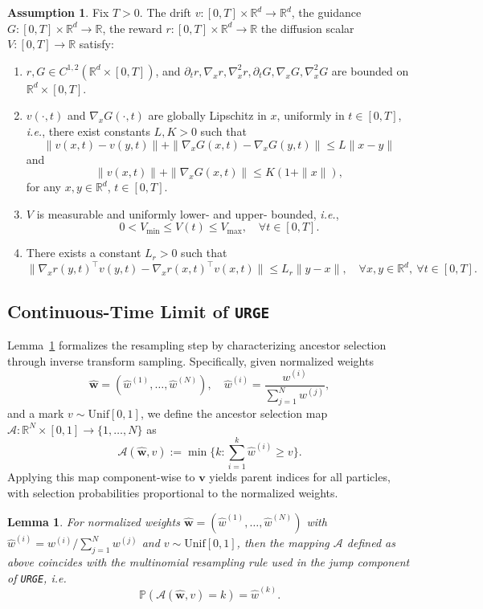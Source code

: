 \documentclass{article}
\newcommand{\mathbbm}[1]{\boldsymbol{#1}}
\theoremstyle{plain}
\newtheorem{lemma}[theorem]{Lemma}
\theoremstyle{definition}
\newtheorem{assumption}[theorem]{Assumption}
\theoremstyle{remark}
\renewcommand{\P}{{\mathbb{P}}}
\newcommand{\R}{{\mathbb{R}}}
\begin{document}
\begin{assumption}\label{basic_assumption_on_diffusion}
Fix $T>0$. The drift $v:[0,T]\times\mathbb R^d\to\mathbb R^d$, the guidance \(G:[0,T]\times\mathbb R^d\rightarrow\R\), the reward \(r:[0,T]\times\mathbb R^d\rightarrow\R\) the diffusion scalar $V:[0,T]\to\mathbb R$ satisfy:
\begin{enumerate}
    \item $r,G \in C^{1,2}(\mathbb R^d\times[0,T])$, and $\partial_t r,\nabla_x r,\nabla_x^2 r, \partial_t G,\nabla_x G,\nabla_x^2 G$ are bounded on $\mathbb R^d\times[0,T]$.
    \item $v(\cdot,t)$ and $\nabla_x G(\cdot,t)$ are globally Lipschitz in $x$, uniformly in $t\in[0,T]$, \emph{i.e.}, there exist constants $L,K>0$ such that \[\|v(x,t)-v(y,t)\| + \|\nabla_x G(x,t)-\nabla_x G(y,t)\|\le L \|x-y\|\] and \[\|v(x,t)\| + \|\nabla_x G(x,t)\| \le K(1+\|x\|),\] for any $x,y\in\mathbb R^d$, $t\in[0,T]$.
    \item $V$ is measurable and uniformly lower- and upper- bounded, \emph{i.e.}, 
    \[ 
        0 < V_\text{min} \leq V(t) \leq V_\text{max},\quad \forall t\in[0,T].
    \]
    \item There exists a constant $L_r>0$ such that 
    \[
    \big\|\nabla_x r(y,t)^\top v(y,t)-\nabla_x r(x,t)^\top v(x,t)\big\|\le L_r \|y-x\|,\quad\forall x,y\in\mathbb R^d,\ \forall t\in[0,T].
    \]
\end{enumerate}
\end{assumption}


\subsection{Continuous-Time Limit of \texttt{URGE}}
\label{sec:Continuous_Time_Limit_of_URGE}

Lemma~\ref{lem:ancestor_selection_mapping} formalizes the resampling step by characterizing ancestor selection through inverse transform sampling. Specifically, given normalized weights
$$\mathbbm{\widehat  w} = (\widehat w^{(1)}, \ldots, \widehat w^{(N)}), \quad \widehat w^{(i)} = \frac{w^{(i)}}{\sum_{j=1}^N w^{(j)}},$$ 
and a mark \({v} \sim \mathrm{Unif}[0,1]\), we define the ancestor selection map \(\mathcal{A} : \R^N \times [0,1] \to \{1,\ldots,N\}\) as \[\mathcal{A}(\mathbbm{\widehat  w}, v):= \min\Big\{ k : \sum_{i=1}^k \widehat w^{(i)} \ge v \Big\}.\] Applying this map component-wise to \(\mathbbm{v}\) yields parent indices for all particles, with selection probabilities proportional to the normalized weights.
\begin{lemma}
For normalized weights \(\mathbbm{\widehat  w}=(\widehat w^{(1)},\ldots,\widehat w^{(N)})\) with 
\(\widehat w^{(i)} = w^{(i)} \big/ \sum_{j=1}^N w^{(j)}\) and \(v \sim \mathrm{Unif}[0,1]\), 
then the mapping \(\mathcal{A}\) defined as above coincides with the multinomial resampling rule used in the jump component of \texttt{URGE}, \emph{i.e.} 
\[
    \P\left(\mathcal{A}(\mathbbm{\widehat  w},v)=k\right) = \widehat w^{(k)}.
\]
\label{lem:ancestor_selection_mapping}
\end{lemma}
\end{document}
